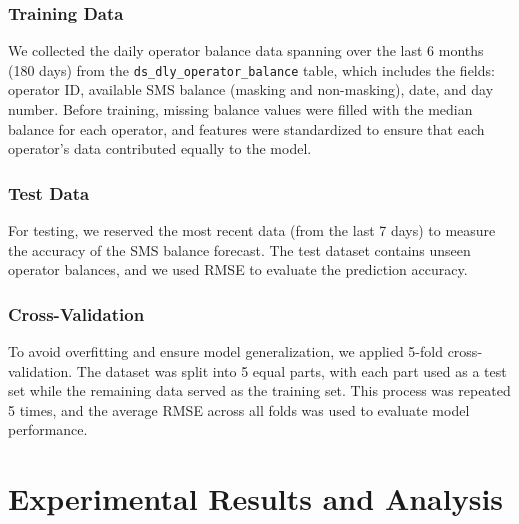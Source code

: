 \documentclass[12pt]{book} %
\begin{document}
\subsection{Training Data}
We collected the daily operator balance data spanning over the last 6 months (180 days) from the \texttt{ds\_dly\_operator\_balance}  table, which includes the fields: operator ID, available SMS balance (masking and non-masking), date, and day number. Before training, missing balance values were filled with the median balance for each operator, and features were standardized to ensure that each operator's data contributed equally to the model.


\subsection{Test Data}
For testing, we reserved the most recent data (from the last 7 days) to measure the accuracy of the SMS balance forecast. The test dataset contains unseen operator balances, and we used RMSE to evaluate the prediction accuracy.



\subsection{Cross-Validation}
To avoid overfitting and ensure model generalization, we applied 5-fold cross-validation. The dataset was split into 5 equal parts, with each part used as a test set while the remaining data served as the training set. This process was repeated 5 times, and the average RMSE across all folds was used to evaluate model performance.









\chapter{Experimental Results and Analysis}
\end{document}
